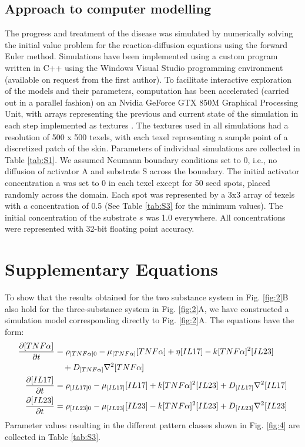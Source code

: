 \subsection{Approach to computer modelling}
The progress and treatment of the disease was simulated by numerically solving the initial value problem for the reaction-diffusion equations using the forward Euler method. Simulations have been implemented using a custom program written in C++ using the Windows Visual Studio programming environment (available on request from the first author). To facilitate interactive exploration of the models and their parameters, computation has been accelerated (carried out in a parallel fashion) on an Nvidia GeForce GTX 850M Graphical Processing Unit, with arrays representing the previous and current state of the simulation in each step implemented as textures \citep{dematte2010, harris2005}. The textures used in all simulations had a resolution of 500 x 500 texels, with each texel representing a sample point of a discretized patch of the skin. Parameters of individual simulations are collected in Table \ref{tab:S1}. We assumed Neumann boundary conditions set to 0, i.e., no diffusion of activator A and substrate S across the boundary. The initial activator concentration a was set to 0 in each texel except for 50 seed spots, placed randomly across the domain.  Each spot was represented by a 3x3 array of texels with $a$ concentration of 0.5 (See Table \ref{tab:S3} for the minimum values). The initial concentration of the substrate $s$ was 1.0 everywhere.  All concentrations were represented with 32-bit floating point accuracy. 

\section{Supplementary Equations}
To show that the results obtained for the two substance system in Fig. \ref{fig:2}B also hold for the three-substance system in Fig. \ref{fig:2}A, we have constructed a simulation model corresponding directly to Fig. \ref{fig:2}A. The equations have the form: 
\begin{equation}
	\begin{aligned}
		\frac{\partial[TNF\alpha]}{\partial t}&=\rho_{[TNF\alpha]0}-\mu_{[TNF\alpha]}[TNF\alpha]+\eta[IL17]-k[TNF\alpha]^2[IL23] \\ & \quad{} + D_{[TNF\alpha]}\nabla^2[TNF\alpha]\\
		\frac{\partial[IL17]}{\partial t}     &=\rho_{[IL17]0}     -\mu_{[IL17]}[IL17]                     +k[TNF\alpha]^2[IL23]+D_{[IL17]}\nabla^2[IL17]\\
		\frac{\partial[IL23]}{\partial t}     &=\rho_{[IL23]0}     -\mu_{[IL23]}[IL23]                     -k[TNF\alpha]^2[IL23]+D_{[IL23]}\nabla^2[IL23]
	\end{aligned}
\end{equation}
Parameter values resulting in the different pattern classes shown in Fig. \ref{fig:4} are collected in Table \ref{tab:S3}.

